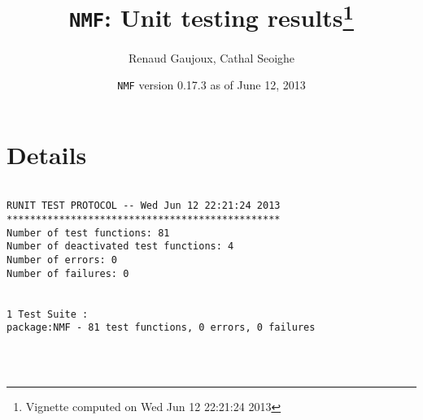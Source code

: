 \documentclass[10pt]{article}\usepackage[]{graphicx}\usepackage[]{color}
\author{Renaud Gaujoux, Cathal Seoighe}
\title{\texttt{NMF}: Unit testing results\footnote{Vignette computed  on Wed Jun 12 22:21:24 2013}}
\date{\texttt{NMF} version 0.17.3 as of June 12, 2013}
\begin{document}
\maketitle

\section{Details}
\begin{verbatim}

RUNIT TEST PROTOCOL -- Wed Jun 12 22:21:24 2013 
*********************************************** 
Number of test functions: 81 
Number of deactivated test functions: 4 
Number of errors: 0 
Number of failures: 0 

 
1 Test Suite : 
package:NMF - 81 test functions, 0 errors, 0 failures




\end{verbatim}
\end{document}
